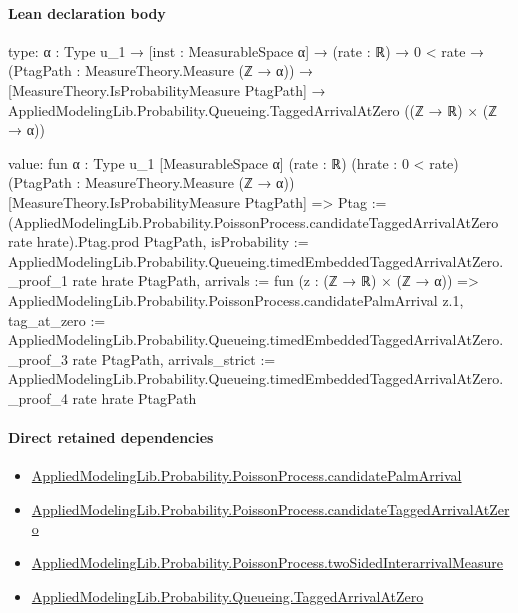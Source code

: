 \documentclass[10pt]{article}
\begin{document}
\paragraph{Lean declaration body}
\begin{ReviewVerbatim}
type:
{α : Type u_1} →
  [inst : MeasurableSpace α] →
    (rate : ℝ) →
      0 < rate →
        (PtagPath : MeasureTheory.Measure (ℤ → α)) →
          [MeasureTheory.IsProbabilityMeasure PtagPath] →
            AppliedModelingLib.Probability.Queueing.TaggedArrivalAtZero ((ℤ → ℝ) × (ℤ → α))

value:
fun {α : Type u_1} [MeasurableSpace α] (rate : ℝ) (hrate : 0 < rate) (PtagPath : MeasureTheory.Measure (ℤ → α))
    [MeasureTheory.IsProbabilityMeasure PtagPath] =>
  { Ptag := (AppliedModelingLib.Probability.PoissonProcess.candidateTaggedArrivalAtZero rate hrate).Ptag.prod PtagPath,
    isProbability :=
      AppliedModelingLib.Probability.Queueing.timedEmbeddedTaggedArrivalAtZero._proof_1 rate hrate PtagPath,
    arrivals := fun (z : (ℤ → ℝ) × (ℤ → α)) => AppliedModelingLib.Probability.PoissonProcess.candidatePalmArrival z.1,
    tag_at_zero := AppliedModelingLib.Probability.Queueing.timedEmbeddedTaggedArrivalAtZero._proof_3 rate PtagPath,
    arrivals_strict :=
      AppliedModelingLib.Probability.Queueing.timedEmbeddedTaggedArrivalAtZero._proof_4 rate hrate PtagPath }
\end{ReviewVerbatim}

\paragraph{Direct retained dependencies}
\begin{itemize}\raggedright
\item \hyperlink{governing-declaration-9208635caa21f800}{Applied\allowbreak{}Modeling\allowbreak{}Lib.\allowbreak{}Probability.\allowbreak{}Poisson\allowbreak{}Process.\allowbreak{}candidate\allowbreak{}Palm\allowbreak{}Arrival}
\item \hyperlink{governing-declaration-b7f1849fb6a62341}{Applied\allowbreak{}Modeling\allowbreak{}Lib.\allowbreak{}Probability.\allowbreak{}Poisson\allowbreak{}Process.\allowbreak{}candidate\allowbreak{}Tagged\allowbreak{}Arrival\allowbreak{}At\allowbreak{}Zero}
\item \hyperlink{governing-declaration-a5c5dbd6c5850d8d}{Applied\allowbreak{}Modeling\allowbreak{}Lib.\allowbreak{}Probability.\allowbreak{}Poisson\allowbreak{}Process.\allowbreak{}two\allowbreak{}Sided\allowbreak{}Interarrival\allowbreak{}Measure}
\item \hyperlink{governing-declaration-a69bedb5b0d420c6}{Applied\allowbreak{}Modeling\allowbreak{}Lib.\allowbreak{}Probability.\allowbreak{}Queueing.\allowbreak{}Tagged\allowbreak{}Arrival\allowbreak{}At\allowbreak{}Zero}
\end{itemize}
\hypertarget{governing-declaration-e9116e504d73a45c}{}
\end{document}
